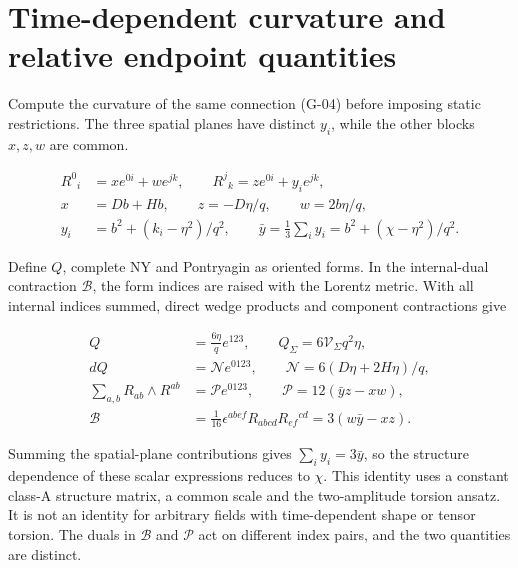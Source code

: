 \section{Time-dependent curvature and relative endpoint quantities}

Compute the curvature of the same connection (G-04) before imposing static restrictions. The three spatial planes have distinct $y_i$, while the other blocks $x,z,w$ are common.

\begin{equation}\tag{D-01}\label{eq:D-01}
\begin{aligned}
R^0{}_{i}&=x e^{0i}+w e^{jk},\qquad R^j{}_{k}=z e^{0i}+y_i e^{jk},\\
x&=Db+Hb,\qquad z=-D\eta/q,\qquad w=2b\eta/q,\\
y_i&=b^2+(k_i-\eta^2)/q^2,\qquad
\bar y=\tfrac13\sum_i y_i=b^2+(\chi-\eta^2)/q^2.
\end{aligned}
\end{equation}

Define $Q$, complete NY and Pontryagin as oriented forms. In the internal-dual contraction $\mathcal B$, the form indices are raised with the Lorentz metric. With all internal indices summed, direct wedge products and component contractions give

\begin{equation}\tag{D-02}\label{eq:D-02}
\begin{aligned}
Q&=\frac{6\eta}{q}e^{123},\qquad Q_{\Sigma}=6\mathcal V_{\Sigma}q^2\eta,\\
dQ&=\mathcal N e^{0123},\qquad \mathcal N=6(D\eta+2H\eta)/q,\\
\sum_{a,b}R_{ab}\wedge R^{ab}&=\mathcal P e^{0123},\qquad
\mathcal P=12(\bar y z-xw),\\
\mathcal B&=\tfrac1{16}\epsilon^{abef}R_{abcd}R_{ef}{}^{cd}
=3(w\bar y-xz).
\end{aligned}
\end{equation}

Summing the spatial-plane contributions gives $\sum_i y_i=3\bar y$, so the structure dependence of these scalar expressions reduces to $\chi$. This identity uses a constant class-A structure matrix, a common scale and the two-amplitude torsion ansatz. It is not an identity for arbitrary fields with time-dependent shape or tensor torsion. The duals in $\mathcal B$ and $\mathcal P$ act on different index pairs, and the two quantities are distinct.

